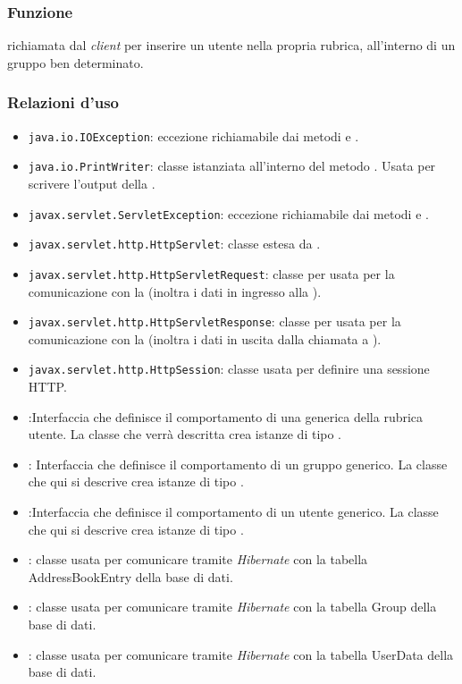 

\subsubsection*{Funzione}
 richiamata dal \textit{client} per inserire un utente nella propria rubrica, all'interno di un gruppo ben determinato.

\subsubsection*{Relazioni d'uso}

\begin{itemize}
	\item \texttt{java.io.IOException}: eccezione richiamabile dai metodi  e .
	\item \texttt{java.io.PrintWriter}: classe istanziata all'interno del metodo . Usata per scrivere l'output della .
	\item \texttt{javax.servlet.ServletException}: eccezione richiamabile dai metodi  e .
	\item \texttt{javax.servlet.http.HttpServlet}: classe estesa da .
	\item \texttt{javax.servlet.http.HttpServletRequest}:  classe per usata per la comunicazione con la  (inoltra i dati in ingresso alla ).
	\item \texttt{javax.servlet.http.HttpServletResponse}: classe per usata per la comunicazione con la  (inoltra i dati in uscita dalla chiamata a ).
	\item \texttt{javax.servlet.http.HttpSession}: classe usata per definire una sessione HTTP.
	\item {}:Interfaccia che definisce il comportamento di una generica  della rubrica utente. La classe che verrà descritta crea istanze di tipo .
	\item {}:
Interfaccia che definisce il comportamento di un gruppo generico. La classe che qui si descrive crea istanze di tipo .
	\item {}:Interfaccia che definisce il comportamento di un utente generico. La classe che qui si descrive crea istanze di tipo .
	\item {}: classe usata per comunicare tramite \textit{Hibernate} con la tabella AddressBookEntry della base di dati.
	\item {}: classe usata per comunicare tramite \textit{Hibernate} con la tabella Group della base di dati.
	\item {}: classe usata per comunicare tramite \textit{Hibernate} con la tabella UserData della base di dati.
\end{itemize}

